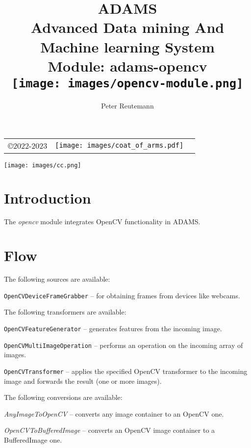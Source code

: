 \documentclass[a4paper]{book}
\title{
  \textbf{ADAMS} \\
  {\Large \textbf{A}dvanced \textbf{D}ata mining \textbf{A}nd \textbf{M}achine
  learning \textbf{S}ystem} \\
  {\Large Module: adams-opencv} \\
  \vspace{1cm}
  \texttt{[image: images/opencv-module.png]} \\
}
\author{
  Peter Reutemann
}
\begin{document}
\begin{titlepage}
\maketitle

\thispagestyle{empty}
\center
\begin{table}[b]
	\begin{tabular}{c l l}
		\parbox[c][2cm]{2cm}{\copyright 2022-2023} &
		\parbox[c][2cm]{5cm}{\texttt{[image: images/coat\_of\_arms.pdf]}} \\
	\end{tabular}
	\texttt{[image: images/cc.png]} \\
\end{table}

\end{titlepage}

\tableofcontents
\listoffigures

\chapter{Introduction}
The \textit{opencv} module integrates OpenCV functionality \cite{opencv} in ADAMS.

\chapter{Flow}
The following sources are available:
\begin{tight_itemize}
  \item \texttt{OpenCVDeviceFrameGrabber} -- for obtaining frames from devices like webcams.
\end{tight_itemize}
The following transformers are available:
\begin{tight_itemize}
  \item \texttt{OpenCVFeatureGenerator} -- generates features from the incoming image.
  \item \texttt{OpenCVMultiImageOperation} -- performs an operation on the incoming array of images.
  \item \texttt{OpenCVTransformer} -- applies the specified OpenCV transformer to the incoming image and
  forwards the result (one or more images).
\end{tight_itemize}
The following conversions are available:
\begin{tight_itemize}
  \item \textit{AnyImageToOpenCV} -- converts any image container to an OpenCV one.
  \item \textit{OpenCVToBufferedImage} -- converts an OpenCV image container to a BufferedImage one.
\end{tight_itemize}


\end{document}

